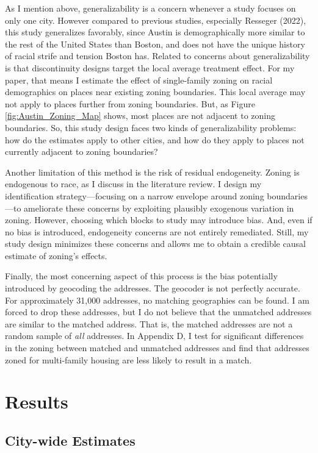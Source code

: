 \documentclass[11pt]{article}
\begin{document}
As I mention above, generalizability is a concern whenever a study focuses on only one city. However compared to previous studies, especially Resseger (2022), this study generalizes favorably, since Austin is demographically more similar to the rest of the United States than Boston, and does not have the unique history of racial strife and tension Boston has. Related to concerns about generalizability is that discontinuity designs target the local average treatment effect. For my paper, that means I estimate the effect of single-family zoning on racial demographics on places near existing zoning boundaries. This local average may not apply to places further from zoning boundaries. But, as Figure \ref{fig:Austin_Zoning_Map} shows, most places are not adjacent to zoning boundaries. So, this study design faces two kinds of generalizability problems: how do the estimates apply to other cities, and how do they apply to places not currently adjacent to zoning boundaries?

Another limitation of this method is the risk of residual endogeneity. Zoning is endogenous to race, as I discuss in the literature review. I design my identification strategy---focusing on a narrow envelope around zoning boundaries---to ameliorate these concerns by exploiting plausibly exogenous variation in zoning. However, choosing which blocks to study may introduce bias. And, even if no bias is introduced, endogeneity concerns are not entirely remediated.  Still, my study design minimizes these concerns and allows me to obtain a credible causal estimate of zoning's effects.

Finally, the most concerning aspect of this process is the bias potentially introduced by geocoding the addresses. The geocoder is not perfectly accurate. For approximately 31,000 addresses, no matching geographies can be found. I am forced to drop these addresses, but I do not believe that the unmatched addresses are similar to the matched address. That is, the matched addresses are not a random sample of \textit{all} addresses. In Appendix D, I test for significant differences in the zoning between matched and unmatched addresses and find that addresses zoned for multi-family housing are less likely to result in a match.


\section{Results}

\subsection{City-wide Estimates}
\end{document}
